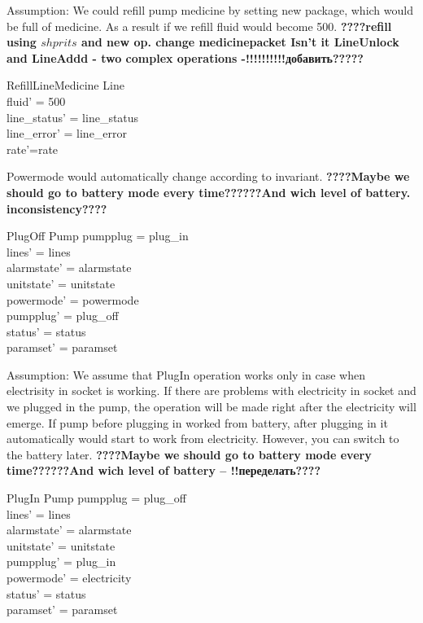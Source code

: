 \documentclass{article}
\begin{document}
Assumption: We could refill pump medicine by setting new package, which would be full of medicine. As a result if we refill fluid would become 500.
\textbf{????refill using $shprits$ and new op. change medicinepacket Isn't it LineUnlock and LineAddd - two complex operations -!!!!!!!!!!добавить?????}

	\begin{schema}{RefillLineMedicine}
		\Delta Line \\
	\where
	    fluid' = 500 \\
	    line\_status' = line\_status \\
		line\_error' = line\_error \\
		rate'=rate
	\end{schema}
	
	

	Powermode would automatically change according to invariant.
		\textbf{????Maybe we should go to battery mode every time??????And wich level of battery. inconsistency????}
		
	\begin{schema}{PlugOff}
		\Delta Pump		
	\where
		pumpplug = plug\_in \\		
		lines' = lines  \\
    	alarmstate' = alarmstate \\
    	unitstate' = unitstate \\
    	powermode' = powermode \\
    	pumpplug' = plug\_off \\
    	status' = status \\		
		paramset' = paramset		
	\end{schema}
	
	 Assumption: We assume that PlugIn operation works only in case when electrisity in socket is working. If there are problems with electricity in socket and we plugged in the pump, the operation will be made right after the electricity will emerge. If pump before plugging in worked from battery, after plugging in it automatically would start to work from electricity. However, you can switch to the battery later. 
		\textbf{????Maybe we should go to battery mode every time??????And wich level of battery -- !!переделать????}
	\begin{schema}{PlugIn}
		\Delta Pump 
	\where
		pumpplug = plug\_off \\
		lines' = lines  \\
    	alarmstate' = alarmstate \\
    	unitstate' = unitstate \\
    	pumpplug' = plug\_in \\
    	powermode' = electricity \\
		status' = status \\
		paramset' = paramset		
	\end{schema}
   
\end{document}
